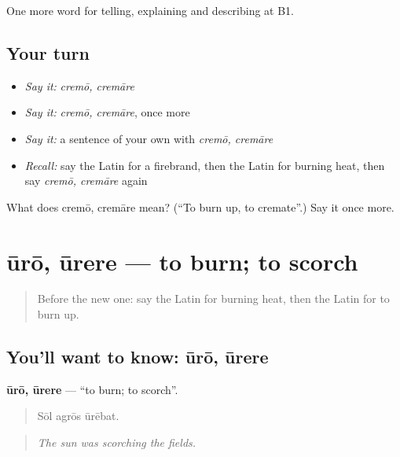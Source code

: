 \begin{grammarlens}[title={What you've built}]
One more word for telling, explaining and describing at B1.
\end{grammarlens}

\subsection*{Your turn}
\begin{itemize}
\raggedright
  \item \emph{Say it:} \emph{cremō, cremāre}
  \item \emph{Say it:} \emph{cremō, cremāre}, once more
  \item \emph{Say it:} a sentence of your own with \emph{cremō, cremāre}
  \item \emph{Recall:} say the Latin for a firebrand, then the Latin for burning heat, then say \emph{cremō, cremāre} again
\end{itemize}

\begin{tcolorbox}[breakable,colback=teal!4,colframe=teal!35!black,title={Before you move on}]
What does cremō, cremāre mean? (\textquotedblleft{}To burn up, to cremate\textquotedblright{}.) Say it once more.
\end{tcolorbox}
\section[ūrō, ūrere]{ūrō, ūrere — to burn; to scorch}

\label{lesson:LA-C318-uro}



\begin{quote}
Before the new one: say the Latin for burning heat, then the Latin for to burn up.
\end{quote}

\subsection*{You'll want to know: ūrō, ūrere}
\textbf{ūrō, ūrere} — \textquotedblleft{}to burn; to scorch\textquotedblright{}.

\begin{quote}
Sōl agrōs ūrēbat.
\end{quote}

\begin{quote}
\emph{The sun was scorching the fields.}
\end{quote}

